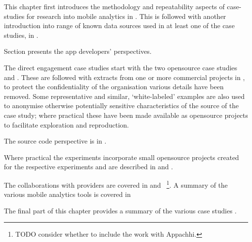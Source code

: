 This chapter first introduces the methodology and repeatability aspects of case-studies for research into mobile analytics in . This is followed with another introduction into range of known data sources used in at least one of the case studies, in . 

Section  presents the app developers' perspectives. 

The direct engagement case studies start with the two opensource case studies  and . These are followed with extracts from one or more commercial projects in , to protect the confidentiality of the organisation various details have been removed. Some representative and similar, `white-labeled' examples are also used to anonymise otherwise potentially sensitive characteristics of the source of the case study; where practical these have been made available as opensource projects to facilitate exploration and reproduction.

The source code perspective is in .

Where practical the experiments incorporate small opensource projects created for the respective experiments and are described in  and . 

The collaborations with providers are covered in  and ~\footnote{TODO consider whether to include the work with Appachhi.}. A summary of the various mobile analytics tools is covered in 

The final part of this chapter provides a summary of the various case studies . 

\hrulefill
\clearpage
